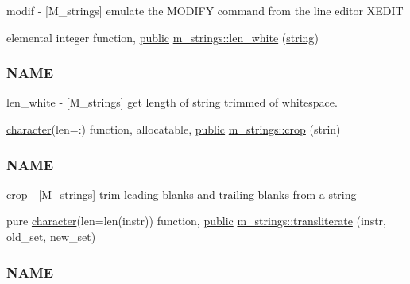 \begin{DoxyCompactItemize}
\begin{DoxyCompactList}
modif -\/ \mbox{[}M\+\_\+strings\mbox{]} emulate the M\+O\+D\+I\+FY command from the line editor X\+E\+D\+IT \end{DoxyCompactList}\item 
elemental integer function, \hyperlink{M__stopwatch_83_8txt_a2f74811300c361e53b430611a7d1769f}{public} \hyperlink{namespacem__strings_aa1427d5dd673ff986236ba1732e693c1}{m\+\_\+strings\+::len\+\_\+white} (\hyperlink{what__overview_81_8txt_a74cb7e955273b9f9157b4f0c18a38849}{string})
\begin{DoxyCompactList}\small\item\em \subsubsection*{N\+A\+ME}

len\+\_\+white -\/ \mbox{[}M\+\_\+strings\mbox{]} get length of string trimmed of whitespace. \end{DoxyCompactList}\item 
\hyperlink{option__stopwatch_83_8txt_abd4b21fbbd175834027b5224bfe97e66}{character}(len=\+:) function, allocatable, \hyperlink{M__stopwatch_83_8txt_a2f74811300c361e53b430611a7d1769f}{public} \hyperlink{namespacem__strings_a7030d33ae9e65d8cf2e2cb9332ffdac0}{m\+\_\+strings\+::crop} (strin)
\begin{DoxyCompactList}\small\item\em \subsubsection*{N\+A\+ME}

crop -\/ \mbox{[}M\+\_\+strings\mbox{]} trim leading blanks and trailing blanks from a string \end{DoxyCompactList}\item 
pure \hyperlink{option__stopwatch_83_8txt_abd4b21fbbd175834027b5224bfe97e66}{character}(len=len(instr)) function, \hyperlink{M__stopwatch_83_8txt_a2f74811300c361e53b430611a7d1769f}{public} \hyperlink{namespacem__strings_aaee428861205782e002f5e7e8fb002f0}{m\+\_\+strings\+::transliterate} (instr, old\+\_\+set, new\+\_\+set)
\begin{DoxyCompactList}\small\item\em \subsubsection*{N\+A\+ME}


\end{DoxyCompactList}
\end{DoxyCompactItemize}
